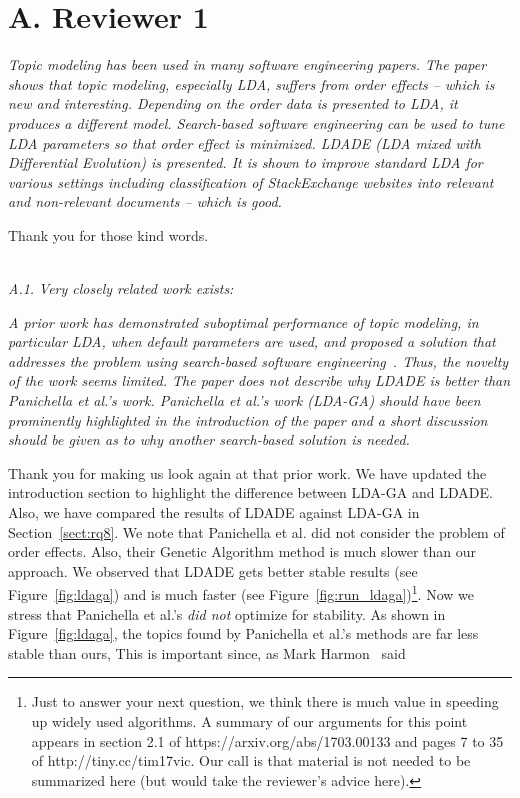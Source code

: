 \documentclass[twocolumn,5p,sort&compress]{elsarticle}
\theoremstyle{break}
\begin{document}
\newpage
\section*{A. Reviewer 1}

\textit{Topic modeling has been used in many software engineering papers. The paper shows that topic modeling, especially LDA, suffers from order effects -- which is new and interesting. Depending on the order data is presented to LDA, it produces a different model. Search-based software engineering can be used to tune LDA parameters so that order effect is minimized. LDADE (LDA mixed with Differential Evolution) is presented. It is shown to improve standard LDA for various settings including classification of StackExchange websites into relevant and non-relevant documents -- which is good.\\}

Thank you for those kind words.

\noindent
\textit{\\A.1.}
\textit{Very closely related work exists:}

\textit{A prior work has demonstrated suboptimal performance of topic modeling, in particular LDA, when default parameters are used, and proposed a solution that addresses the problem using search-based software engineering~\cite{panichella2013effectively}. Thus, the novelty of the work seems limited. The paper does not describe why LDADE is better than Panichella et al.'s work. Panichella et al.'s work (LDA-GA) should have been prominently highlighted in the introduction of the paper and a short discussion should be given as to why another search-based solution is needed.\\}

Thank you for making us look again at that prior work.
We have updated the introduction section to highlight the difference between LDA-GA and LDADE. Also,
we have compared the results of LDADE against LDA-GA in Section~\ref{sect:rq8}.
We note that
Panichella et al. did not consider the problem of order effects. Also, their  Genetic Algorithm method
is much slower than our approach. We observed that LDADE 
gets better stable results (see Figure~\ref{fig:ldaga}) 
and is much faster (see Figure~\ref{fig:run_ldaga})\footnote{Just to answer your next question, we think there is much 
value in speeding up widely used algorithms.
A summary  of our arguments for this point appears in section 2.1 of https://arxiv.org/abs/1703.00133  and  pages 7 to 35 of http://tiny.cc/tim17vic.
Our call is that material is not needed to be summarized here (but would take the reviewer's advice here).}.
Now we stress that   Panichella et al.'s  {\em did not} optimize for stability. As shown in Figure~\ref{fig:ldaga}, the topics found by Panichella et al.'s methods are far less stable than ours, This is important since, as Mark Harmon~\cite{harman2007current} said
\end{document}
